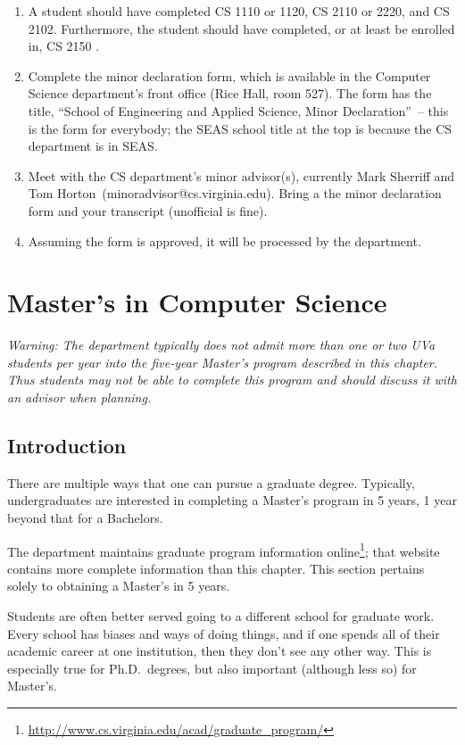 \documentclass[10pt,letter]{book}
\makeatletter
\newenvironment{numlist}{
\begin{enumerate}
\setlength{\itemsep}{0pt}
\setlength{\parskip}{0pt}}
{\end{enumerate}}
\newcommand{\csminoradvisor}{Mark Sherriff and Tom Horton}
\newcommand{\csminoradvisoremail}{minoradvisor@cs.virginia.edu}
\newcommand{\mychapter}[2]{\chapter{#1}\renewcommand{\leftmark}{\textsc{#2}}}
\newcommand{\mysection}[1]{\section{#1}\renewcommand{\rightmark}{#1}}
\newcommand{\myurl}[1]{\footnote{\scriptsize\url{#1}}}
\makeatother
\begin{document}
\begin{numlist}

\item A student should have completed CS 1110 or 1120, CS
  2110 or 2220, and CS 2102. Furthermore, the
  student should have completed, or at least be enrolled in, CS 2150
 .

\item Complete the minor declaration form, which is available in the
  Computer Science department's front office (Rice Hall, room 527).
  The form has the title, ``School of Engineering and Applied Science,
  Minor Declaration''~-- this is the form for everybody; the SEAS
  school title at the top is because the CS department is in SEAS.

\item Meet with the CS department's minor advisor(s), currently
  \csminoradvisor\ (\csminoradvisoremail).  Bring a the minor
  declaration form and your transcript (unofficial is fine).

\item Assuming the form is approved, it will be processed by the
  department.

\end{numlist}


\clearpage
\mychapter{Master's in Computer Science}{Masters in CS}


{\Large\em Warning: The department typically does not admit more than
  one or two UVa students per year into the five-year Master's program
  described in this chapter. Thus students may not be able to complete
  this program and should discuss it with an advisor when planning.}

\mysection{Introduction}

There are multiple ways that one can pursue a graduate degree.
Typically, undergraduates are interested in completing a Master's
program in 5 years, 1 year beyond that for a Bachelors.

The department maintains graduate program information
online\myurl{http://www.cs.virginia.edu/acad/graduate_program/};
that website contains more complete information than this chapter.
This section pertains solely to obtaining a Master's in 5 years.

Students are often better served going to a different school for
graduate work.  Every school has biases and ways of doing things, and
if one spends all of their academic career at one institution, then
they don't see any other way.  This is especially true for
Ph.D.\ degrees, but also important (although less so) for Master's.
\end{document}

